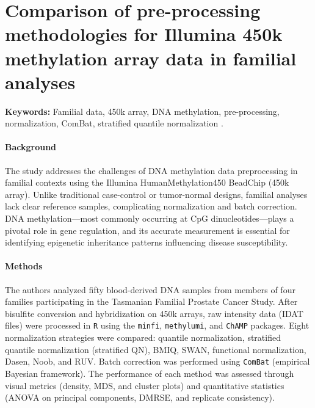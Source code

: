 \documentclass[10pt]{extarticle}
\begin{document}
\section{Comparison of pre-processing methodologies for Illumina 450k methylation array data in familial analyses}

\textbf{Keywords:} Familial data, 450k array, DNA methylation, pre-processing, normalization, ComBat, stratified quantile normalization \cite{Cazaly2016}.

\paragraph{Background}
The study addresses the challenges of DNA methylation data preprocessing in familial contexts using the Illumina HumanMethylation450 BeadChip (450k array). Unlike traditional case-control or tumor-normal designs, familial analyses lack clear reference samples, complicating normalization and batch correction. DNA methylation—most commonly occurring at CpG dinucleotides—plays a pivotal role in gene regulation, and its accurate measurement is essential for identifying epigenetic inheritance patterns influencing disease susceptibility.

\paragraph{Methods}
The authors analyzed fifty blood-derived DNA samples from members of four families participating in the Tasmanian Familial Prostate Cancer Study. After bisulfite conversion and hybridization on 450k arrays, raw intensity data (IDAT files) were processed in \texttt{R} using the \texttt{minfi}, \texttt{methylumi}, and \texttt{ChAMP} packages. Eight normalization strategies were compared: quantile normalization, stratified quantile normalization (stratified QN), BMIQ, SWAN, functional normalization, Dasen, Noob, and RUV. Batch correction was performed using \texttt{ComBat} (empirical Bayesian framework). The performance of each method was assessed through visual metrics (density, MDS, and cluster plots) and quantitative statistics (ANOVA on principal components, DMRSE, and replicate consistency).
\end{document}
